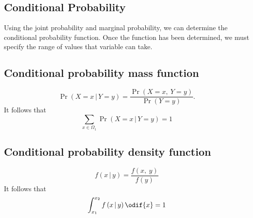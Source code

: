 \documentclass{article}
\begin{document}
\begin{multicols}{3}
    \subsection{Conditional Probability}
    Using the joint probability and marginal probability, we can determine the conditional probability function.
    Once the function has been determined, we must specify the range of values that variable can take.
    \subsection{Conditional probability mass function}
    \begin{equation*}
        \Pr{\left( X = x \,\vert\, Y = y \right)} = \frac{\Pr{\left( X = x,\: Y = y \right)}}{\Pr{\left( Y = y \right)}}.
    \end{equation*}
    It follows that
    \begin{equation*}
        \sum_{x \in \Omega_1} \Pr{\left( X = x \,\vert\, Y = y \right)} = 1
    \end{equation*}
    \subsection{Conditional probability density function}
    \begin{equation*}
        f\left( x \,\vert\, y \right) = \frac{f\left( x,\: y \right)}{f\left( y \right)}
    \end{equation*}
    It follows that
    \begin{equation*}
        \int_{x_1}^{x_2} f\left( x \,\vert\, y \right) \odif{x} = 1
    \end{equation*}

\end{multicols}
\end{document}
